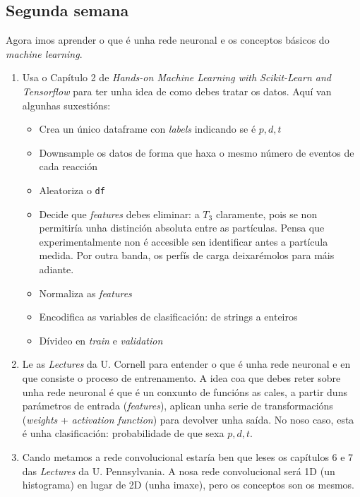 \documentclass[11pt, a4paper]{article}
\begin{document}
\subsection{Segunda semana}
Agora imos aprender o que é unha rede neuronal e os conceptos básicos do \textit{machine learning}.
\begin{enumerate}
    \item Usa o Capítulo 2 de \textit{Hands-on Machine Learning with Scikit-Learn and Tensorflow} para ter unha idea de como debes tratar os datos. Aquí van algunhas suxestións:
          \begin{itemize}
              \item Crea un único dataframe con \textit{labels} indicando se é $p,d,t$
              \item Downsample os datos de forma que haxa o mesmo número de eventos de cada reacción
              \item Aleatoriza o \verb|df|
              \item Decide que \textit{features} debes eliminar: a $T_3$ claramente, pois se non permitiría unha distinción absoluta entre as partículas. Pensa que experimentalmente non é accesible sen identificar antes a partícula medida. Por outra banda, os perfís de carga deixarémolos para máis adiante.
              \item Normaliza as \textit{features}
              \item Encodifica as variables de clasificación: de strings a enteiros
              \item Dívideo en \textit{train} e \textit{validation}
          \end{itemize}
    \item Le as \textit{Lectures} da U. Cornell para entender o que é unha rede neuronal e en que consiste o proceso de entrenamento. A idea coa que debes reter sobre unha rede neuronal é que é un conxunto de funcións as cales, a partir duns parámetros de entrada (\textit{features}), aplican unha serie de transformacións (\textit{weights} + \textit{activation function}) para devolver unha saída. No noso caso, esta é unha clasificación: probabilidade de que sexa $p,d,t$.
    \item Cando metamos a rede convolucional estaría ben que leses os capítulos 6 e 7 das \textit{Lectures} da U. Pennsylvania. A nosa rede convolucional será 1D (un histograma) en lugar de 2D (unha imaxe), pero os conceptos son os mesmos.
\end{enumerate}
\end{document}
